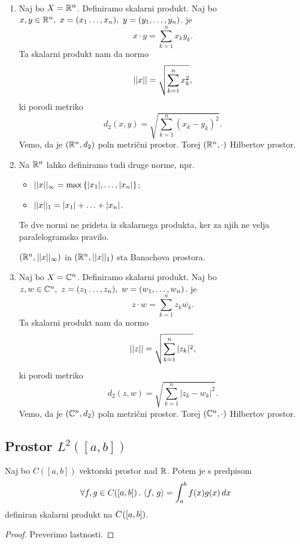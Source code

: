 \begin{zgled}
\
\begin{enumerate}
    \item Naj bo \(X = \mathbb{R}^n\). Definiramo skalarni produkt. Naj bo \(x, y \in \mathbb{R}^n, \ x = (x_1 \ldots, x_n), \ y = (y_1, \ldots, y_n)\).  je \[x \cdot y = \sum_{k=1}^{n} x_ky_k.\]
    Ta skalarni produkt nam da normo \[||x|| = \sqrt{\sum_{k=1}^{n} x_k^2},\]
    ki porodi metriko \[d_2(x,y) = \sqrt{\sum_{k=1}^{n} (x_k - y_k)^2}.\]
    Vemo, da je \((\mathbb{R}^n, d_2)\) poln metrični prostor. Torej \((\mathbb{R}^n, \cdot)\) Hilbertov prostor.
    \newpage
    \item Na \(\mathbb{R}^n\) lahko definiramo tudi druge norme, npr.
    \begin{itemize}
        \item \(||x||_\infty = \max \left\{|x_1|, \ldots, |x_n|\right\}\);
        \item \(||x||_1 = |x_1| + \ldots + |x_n|\). 
    \end{itemize}
    Te dve normi ne prideta iz skalarnega produkta, ker za njih ne velja paralelogramsko pravilo.

    \((\mathbb{R}^n, ||x||_\infty)\) in \((\mathbb{R}^n, ||x||_1)\) sta Banachova prostora.
    \item Naj bo \(X = \mathbb{C}^n\). Definiramo skalarni produkt. Naj bo \(z, w \in \mathbb{C}^n, \ z = (z_1 \ldots, z_n), \ w = (w_1, \ldots, w_n)\).  je \[z \cdot w = \sum_{k=1}^{n} z_k\overline{w_k}.\]
    Ta skalarni produkt nam da normo \[||z|| = \sqrt{\sum_{k=1}^{n} |z_k|^2},\]
    ki porodi metriko \[d_2(z,w) = \sqrt{\sum_{k=1}^{n} |z_k - w_k|^2}.\]
    Vemo, da je \((\mathbb{C}^n, d_2)\) poln metrični prostor. Torej \((\mathbb{C}^n, \cdot)\) Hilbertov prostor.
\end{enumerate}
\end{zgled}

\subsection{Prostor \(L^2([a, b])\)}
\begin{trditev}
    Naj bo \(C([a,b])\) vektorski prostor nad \(\mathbb{R}\). Potem je s predpisom \[\forall f, g \in C([a,b]) \,.\, \left\langle f, \, g \right\rangle = \int_{a}^{b} f(x) g(x) \, dx\]
    definiran skalarni produkt na \(C^{}([a,b])\).
\end{trditev}

\begin{proof}
    Preverimo lastnosti.
\end{proof}

